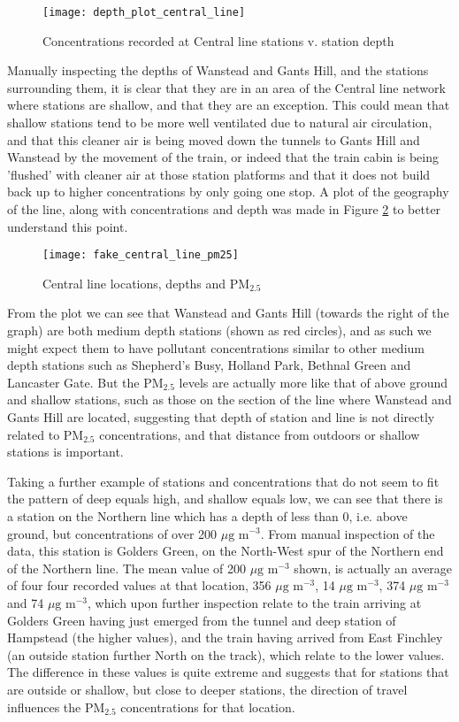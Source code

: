 \begin{figure}[H]
\centering
\texttt{[image: depth\_plot\_central\_line]}
\caption{Concentrations recorded at Central line stations v. station depth}
\label{fig:depth_plot_central_line}
\end{figure}

Manually inspecting the depths of Wanstead and Gants Hill, and the stations surrounding them, it is clear that they are in an area of the Central line network where stations are shallow, and that they are an exception. This could mean that shallow stations tend to be more well ventilated due to natural air circulation, and that this cleaner air is being moved down the tunnels to Gants Hill and Wanstead by the movement of the train, or indeed that the train cabin is being 'flushed' with cleaner air at those station platforms and that it does not build back up to higher concentrations by only going one stop. A plot of the geography of the line, along with concentrations and depth was made in Figure \ref{fig:fake_central_line_pm25} to better understand this point.

\begin{figure}[H]
\centering
\texttt{[image: fake\_central\_line\_pm25]}
\caption{Central line locations, depths and PM$_{2.5}$}
\label{fig:fake_central_line_pm25}
\end{figure}

From the plot we can see that Wanstead and Gants Hill (towards the right of the graph) are both medium depth stations (shown as red circles), and as such we might expect them to have pollutant concentrations similar to other medium depth stations such as Shepherd's Busy, Holland Park, Bethnal Green and Lancaster Gate. But the PM$_{2.5}$ levels are actually more like that of above ground and shallow stations, such as those on the section of the line where Wanstead and Gants Hill are located, suggesting that depth of station and line is not directly related to PM$_{2.5}$ concentrations, and that distance from outdoors or shallow stations is important.

Taking a further example of stations and concentrations that do not seem to fit the pattern of deep equals high, and shallow equals low, we can see that there is a station on the Northern line which has a depth of less than 0, i.e. above ground, but concentrations of over 200 $\mu \text{g m}^{-3}$. From manual inspection of the data, this station is Golders Green, on the North-West spur of the Northern end of the Northern line. The mean value of 200 $\mu \text{g m}^{-3}$ shown, is actually an average of four four recorded values at that location, 356 $\mu \text{g m}^{-3}$, 14 $\mu \text{g m}^{-3}$, 374 $\mu \text{g m}^{-3}$ and 74 $\mu \text{g m}^{-3}$, which upon further inspection relate to the train arriving at Golders Green having just emerged from the tunnel and deep station of Hampstead (the higher values), and the train having arrived from East Finchley (an outside station further North on the track), which relate to the lower values. The difference in these values is quite extreme and suggests that for stations that are outside or shallow, but close to deeper stations, the direction of travel influences the PM$_{2.5}$ concentrations for that location.

